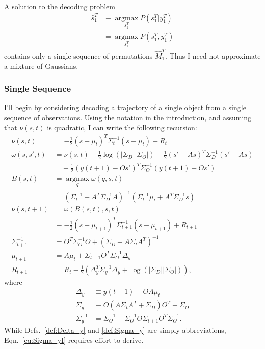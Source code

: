 \documentclass[12pt]{article}
\newcommand{\ti}[2]{{#1}{(#2)}}                         %
\newcommand{\ts}[4]{{#1}_{#3}^{#4}} %
\newcommand{\argmax}{\operatorname*{argmax}}
\newcommand{\logdet}{\log\left(\left|\Sigma_D\right| \left| \Sigma_O
    \right| \right)}
\begin{document}
A solution to the decoding problem
\begin{align*}
  \ts{\hat s}{\tau}{1}{T} &\equiv \argmax_{\ts{s}{\tau}{1}{T}}
  P(\ts{s}{\tau}{1}{T}|\ts{y}{\tau}{1}{T}) \\
            &=  \argmax_{\ts{s}{\tau}{1}{T}} P(\ts{s}{\tau}{1}{T},\ts{y}{\tau}{1}{T})
\end{align*}
contains only a single sequence of permutations $\ts{\hat
  M}{t}{1}{T}$.  Thus I need not approximate a mixture of Gaussians.

\subsubsection{Single Sequence}
\label{sec:single-sequence}

I'll begin by considering decoding a trajectory of a single object
from a single sequence of observations.  Using the notation in the
introduction, and assuming that $\nu(s,t)$ is quadratic, I can write
the following recursion:
\begin{align}
  \nu(s,t) &= -\frac{1}{2}(s-\mu_{t})^T
    \Sigma_{t}^{-1}(s-\mu_{t}) + R_t \nonumber \\
  \label{eq:decode_u'}
  \omega(s,s',t) &= \nu(s,t) -\frac{1}{2} \logdet  - 
  \frac{1}{2}(s'-As)^T \Sigma_{D}^{-1} (s'-As)  \nonumber \\
  &\quad - \frac{1}{2}(\ti{y}{t+1} - O s')^T \Sigma_{O}^{-1}(\ti{y}{t+1}
    - O s') \\
  B(s,t) &= \argmax_{q} \omega(q,s,t) \nonumber \\
  \label{eq:decode_B}
  &= \left( \Sigma_t^{-1} + A^T \Sigma_D^{-1} A \right)^{-1} \left(
    \Sigma_t^{-1} \mu_t + A^T \Sigma_D^{-1} s \right) \\
  \nu(s,t+1) &= \omega(B(s,t),s,t) \nonumber \\
  &\equiv  -\frac{1}{2}(s-\mu_{t+1})^T
  \Sigma_{t+1}^{-1}(s-\mu_{t+1}) + R_{t+1} \nonumber \\
  \label{eq:new_Sigma}
  \Sigma_{t+1}^{-1} & = O^T\Sigma_O^{-1} O + \left( \Sigma_D + A \Sigma_t
    A^T \right)^{-1} \\
  \label{eq:new_mu}
  \mu_{t+1} &= A \mu_t + \Sigma_{t+1} O^T \Sigma_O^{-1} \Delta_y \\
  \label{eq:new_R}
  R_{t+1} &= R_t -\frac{1}{2} \left( \Delta_y^T \Sigma_y^{-1} \Delta_y
    + \logdet \right),
\end{align}
where
\begin{align}
  \label{def:Delta_y}
  \Delta_y &\equiv \ti{y}{t+1} - OA \mu_t \\
  \label{def:Sigma_y}
  \Sigma_y &\equiv O(A\Sigma_t A^T + \Sigma_D)O^T + \Sigma_O \\
  \label{eq:Sigma_yI}
  \Sigma_y^{-1} &= \Sigma_O^{-1} - \Sigma_O^{-1} O \Sigma_{t+1} O^T
  \Sigma_O^{-1}.
\end{align}
While Defs.~\eqref{def:Delta_y} and  \eqref{def:Sigma_y} are simply
abbreviations, Eqn.~\eqref{eq:Sigma_yI} requires effort to derive.
\end{document}
